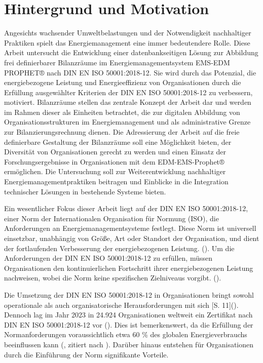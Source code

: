 \section{Hintergrund und Motivation}
Angesichts wachsender Umweltbelastungen und der Notwendigkeit nachhaltiger Praktiken spielt das Energiemanagement eine immer bedeutendere Rolle.
Diese Arbeit untersucht die Entwicklung einer datenbankseitigen Lösung zur Abbildung frei definierbarer Bilanzräume im Energiemanagementsystem
EMS-EDM PROPHET® nach DIN EN ISO 50001:2018-12.
Sie wird durch das Potenzial, die energiebezogene Leistung und Energieeffizienz von Organisationen durch die Erfüllung ausgewählter Kriterien 
der DIN EN ISO 50001:2018-12 zu verbessern, motiviert. 
Bilanzräume stellen das zentrale Konzept der Arbeit dar und werden im Rahmen dieser als Einheiten betrachtet, die zur digitalen Abbildung 
von Organisationsstrukturen im Energiemanagement und als administrative Grenze zur Bilanzierungsrechnung dienen.
Die Adressierung der Arbeit auf die freie definierbare Gestaltung der Bilanzräume soll eine Möglichkeit bieten, der Diversität von Organisationen gerecht zu werden
und einen Einsatz der Forschungsergebnisse in Organisationen mit dem EDM-EMS-Prophet® ermöglichen.
Die Untersuchung soll zur Weiterentwicklung nachhaltiger Energiemanagementpraktiken beitragen und Einblicke in die Integration
technischer Lösungen in bestehende Systeme bieten.

Ein wesentlicher Fokus dieser Arbeit liegt auf der DIN EN ISO 50001:2018-12, einer Norm der Internationalen Organisation für Normung (ISO),
die Anforderungen an Energiemanagementsysteme festlegt. Diese Norm ist universell einsetzbar, unabhängig von Größe, Art oder Standort der Organisation,
und dient der fortlaufenden Verbesserung der energiebezogenen Leistung. (\cite[S. 7, 10]{ISO.2018}).
Um die Anforderungen der DIN EN ISO 50001:2018-12 zu erfüllen, müssen Organisationen den kontinuierlichen Fortschritt ihrer energiebezogenen Leistung nachweisen, wobei
die Norm keine spezifischen Zielniveaus vorgibt. (\cite[S. 10]{ISO.2018}).

Die Umsetzung der DIN EN ISO 50001:2018-12 in Organisationen bringt sowohl operationale als auch organisatorische Herausforderungen mit sich [S. 11](\cite{Marimon.2017}).
Dennoch lag im Jahr 2023 in 24.924 Organisationen weltweit ein Zertifikat nach DIN EN ISO 50001:2018-12 vor (\cite{InternationalOrganizationforStandardization.2023}).
Dies ist bemerkenswert, da die Erfüllung der Normanforderungen voraussichtlich etwa 60 \% des globalen Energieverbrauchs beeinflussen
kann (\cite{InternationalOrganizationforStandardization.2011}, zitiert nach \cite[S. 1]{Marimon.2017}). Darüber hinaus entstehen für Organisationen durch
die Einführung der Norm signifikante Vorteile.

